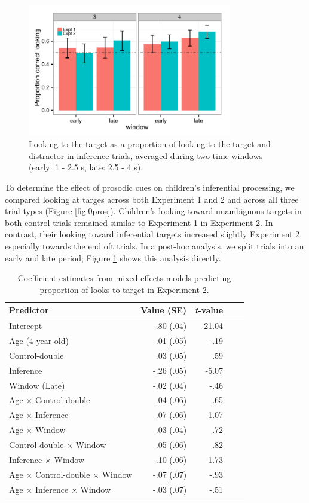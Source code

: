 \documentclass[10pt,letterpaper]{article}
\begin{document}
\begin{figure}[t]
\begin{center} 
\includegraphics[width=3.5in]{figures/simpimp_pros-bar_inf.pdf}
\caption{\label{fig:0prosbar} Looking to the target as a proportion of looking to the target and distractor in inference trials, averaged during two time windows (early: 1 - 2.5 s,  late: 2.5 - 4 s).}
\end{center} 
\end{figure}

To determine the effect of prosodic cues on children's inferential processing, we compared looking at targes across both Experiment 1 and 2 and across all three trial types (Figure \ref{fig:0pros}). Children's looking toward unambiguous targets in both control trials remained similar to Experiment 1 in Experiment 2. In contrast, their looking toward inferential targets increased slightly Experiment 2, especially towards the end oft trials. In a post-hoc analysis, we split trials into an early and late period; Figure \ref{fig:0prosbar} shows this analysis directly. 

\begin{table}[b!]
\caption{\label{tab:lmer1}  Coefficient estimates from mixed-effects models predicting proportion of looks to target in Experiment 2.} 
\begin{center} 
\begin{tabular}{l r r r l} 
\hline
Predictor  &  Value (SE) & \emph{t}-value\\
\hline
Intercept  & .80 (.04) & 21.04 \\
Age (4-year-old) & -.01 (.05) &  -.19 \\
Control-double & .03 (.05) & .59 \\
Inference & -.26 (.05) & -5.07 \\
Window (Late) & -.02 (.04) & -.46 \\
Age $\times$  Control-double & .04 (.06) & .65 \\
Age $\times$  Inference & .07 (.06) & 1.07 \\
Age $\times$  Window & .03 (.04) & .72 \\
Control-double $\times$  Window & .05 (.06) & .82 \\
Inference $\times$  Window & .10 (.06) & 1.73 \\
Age $\times$ Control-double $\times$ Window & -.07 (.07) & -.93 \\
Age $\times$ Inference $\times$ Window & -.03 (.07) & -.51 \\
\hline
\end{tabular} 
\end{center} 
\end{table}
\end{document}
